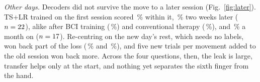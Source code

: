 \emph{Other days.} Decoders did not survive the move to a later session (Fig.~\ref{fig:later}).
TS+LR trained on the first session scored \rqFourLaterPostWithinPreMean\,\% within it,
\rqFourLaterPostUnchangedMean\,\% two weeks later ($n = 22$), alike after
BCI training (\rqFourLaterPostUnchangedGroupBMean\,\%) and conventional therapy
(\rqFourLaterPostUnchangedGroupTMean\,\%), and \rqFourLaterFollowUnchangedMean\,\% a month on
($n = 17$). Re-centring on the new day's rest, which needs no labels,
won back part of the loss (\rqFourLaterPostRecentredKZeroMean\,\% and
\rqFourLaterFollowRecentredKZeroMean\,\%), and five new trials per movement added to the old
session won back more. Across the four questions, then, the leak is large, transfer helps only at
the start, and nothing yet separates the sixth finger from the hand.
